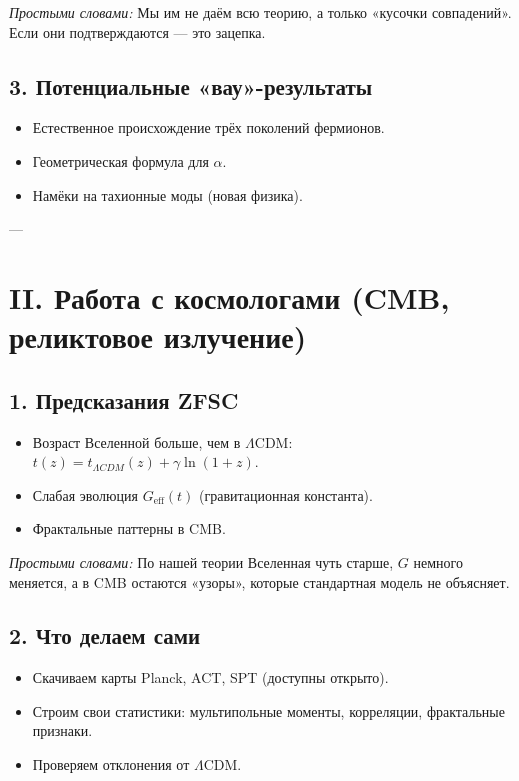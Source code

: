\documentclass[a4paper,12pt]{article}
\begin{document}
\textit{Простыми словами:}  
Мы им не даём всю теорию, а только «кусочки совпадений». Если они подтверждаются — это зацепка.

\subsection*{3. Потенциальные «вау»-результаты}
\begin{itemize}
  \item Естественное происхождение трёх поколений фермионов.  
  \item Геометрическая формула для $\alpha$.  
  \item Намёки на тахионные моды (новая физика).
\end{itemize}

---

\section*{II. Работа с космологами (CMB, реликтовое излучение)}
\subsection*{1. Предсказания ZFSC}
\begin{itemize}
  \item Возраст Вселенной больше, чем в $\Lambda$CDM:  
  $t(z)=t_{\Lambda CDM}(z)+\gamma \ln(1+z)$.  
  \item Слабая эволюция $G_{\text{eff}}(t)$ (гравитационная константа).  
  \item Фрактальные паттерны в CMB.  
\end{itemize}

\textit{Простыми словами:}  
По нашей теории Вселенная чуть старше, $G$ немного меняется, а в CMB остаются «узоры», которые стандартная модель не объясняет.

\subsection*{2. Что делаем сами}
\begin{itemize}
  \item Скачиваем карты Planck, ACT, SPT (доступны открыто).  
  \item Строим свои статистики: мультипольные моменты, корреляции, фрактальные признаки.  
  \item Проверяем отклонения от $\Lambda$CDM.
\end{itemize}
\end{document}
